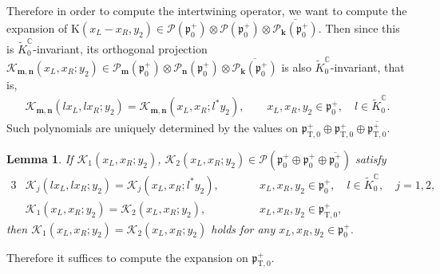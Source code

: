 \documentclass[pdftex]{sigma}
\numberwithin{equation}{section}
\newtheorem{Lemma}[Theorem]{Lemma}
\newcommand{\bk}{\mathbf{k}}
\newcommand{\bm}{\mathbf{m}}
\newcommand{\bn}{\mathbf{n}}
\newcommand{\BC}{\mathbb{C}}
\newcommand{\fp}{\mathfrak{p}}
\newcommand{\cK}{\mathcal{K}}
\newcommand{\cP}{\mathcal{P}}
\newcommand{\rK}{\mathrm{K}}
\newcommand{\rT}{\mathrm{T}}
\begin{document}
Therefore in order to compute the intertwining operator, we want to compute the expansion of
$\rK(x_L-x_R,y_2)\in\cP(\fp^+_0)\otimes\cP(\fp^+_0)\otimes\overline{\cP_\bk(\fp^+_0)}$.
Then since this is $\tilde{K}^\BC_0$-invariant, its orthogonal projection
$\cK_{\bm,\bn}(x_L,x_R;y_2)\in \cP_\bm(\fp^+_0)\otimes\cP_\bn(\fp^+_0)\otimes\overline{\cP_\bk(\fp^+_0)}$ is also $\tilde{K}^\BC_0$-invariant,
that is,
\begin{gather*} \cK_{\bm,\bn}(lx_L,lx_R;y_2)=\cK_{\bm,\bn}(x_L,x_R;l^*y_2), \qquad x_L,x_R,y_2\in\fp^+_0, \quad l\in \tilde{K}^\BC_0. \end{gather*}
Such polynomials are uniquely determined by the values on $\fp^+_{\rT,0}\oplus\fp^+_{\rT,0}\oplus\overline{\fp^+_{\rT,0}}$.
\begin{Lemma}
If $\cK_1(x_L,x_R;y_2)$, $\cK_2(x_L,x_R;y_2)\in \cP(\fp^+_0\oplus\fp^+_0\oplus\overline{\fp^+_0})$ satisfy
\begin{alignat*}{3}
& \cK_j(lx_L,lx_R;y_2)=\cK_j(x_L,x_R;l^*y_2), \qquad && x_L,x_R,y_2\in\fp^+_0, \quad l\in \tilde{K}^\BC_0,\quad j=1,2,& \\
& \cK_1(x_L,x_R;y_2)=\cK_2(x_L,x_R;y_2),\qquad && x_L,x_R,y_2\in\fp^+_{\rT,0},&
\end{alignat*}
then $\cK_1(x_L,x_R;y_2)=\cK_2(x_L,x_R;y_2)$ holds for any $x_L,x_R,y_2\in\fp^+_0$.
\end{Lemma}
Therefore it suffices to compute the expansion on $\fp^+_{\rT,0}$.
\end{document}

